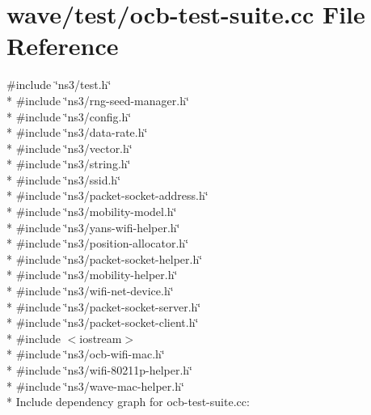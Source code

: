 \hypertarget{ocb-test-suite_8cc}{}\section{wave/test/ocb-\/test-\/suite.cc File Reference}
\label{ocb-test-suite_8cc}
{\ttfamily \#include \char`\"{}ns3/test.\+h\char`\"{}}\\*
{\ttfamily \#include \char`\"{}ns3/rng-\/seed-\/manager.\+h\char`\"{}}\\*
{\ttfamily \#include \char`\"{}ns3/config.\+h\char`\"{}}\\*
{\ttfamily \#include \char`\"{}ns3/data-\/rate.\+h\char`\"{}}\\*
{\ttfamily \#include \char`\"{}ns3/vector.\+h\char`\"{}}\\*
{\ttfamily \#include \char`\"{}ns3/string.\+h\char`\"{}}\\*
{\ttfamily \#include \char`\"{}ns3/ssid.\+h\char`\"{}}\\*
{\ttfamily \#include \char`\"{}ns3/packet-\/socket-\/address.\+h\char`\"{}}\\*
{\ttfamily \#include \char`\"{}ns3/mobility-\/model.\+h\char`\"{}}\\*
{\ttfamily \#include \char`\"{}ns3/yans-\/wifi-\/helper.\+h\char`\"{}}\\*
{\ttfamily \#include \char`\"{}ns3/position-\/allocator.\+h\char`\"{}}\\*
{\ttfamily \#include \char`\"{}ns3/packet-\/socket-\/helper.\+h\char`\"{}}\\*
{\ttfamily \#include \char`\"{}ns3/mobility-\/helper.\+h\char`\"{}}\\*
{\ttfamily \#include \char`\"{}ns3/wifi-\/net-\/device.\+h\char`\"{}}\\*
{\ttfamily \#include \char`\"{}ns3/packet-\/socket-\/server.\+h\char`\"{}}\\*
{\ttfamily \#include \char`\"{}ns3/packet-\/socket-\/client.\+h\char`\"{}}\\*
{\ttfamily \#include $<$iostream$>$}\\*
{\ttfamily \#include \char`\"{}ns3/ocb-\/wifi-\/mac.\+h\char`\"{}}\\*
{\ttfamily \#include \char`\"{}ns3/wifi-\/80211p-\/helper.\+h\char`\"{}}\\*
{\ttfamily \#include \char`\"{}ns3/wave-\/mac-\/helper.\+h\char`\"{}}\\*
Include dependency graph for ocb-\/test-\/suite.cc\+:
